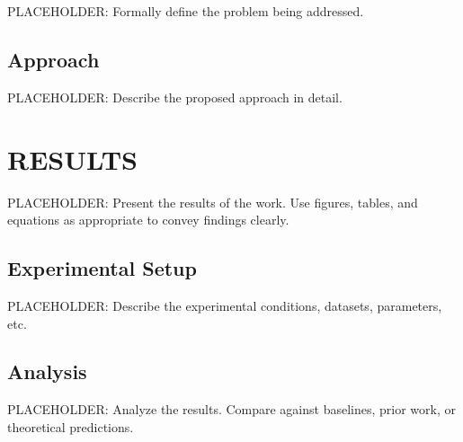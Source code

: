 \documentclass{nrlreport} %
\begin{document}
PLACEHOLDER: Formally define the problem being addressed.

\section{Approach}
\label{sec:approach}

PLACEHOLDER: Describe the proposed approach in detail.



\chapter{RESULTS}
\label{chap:results}

PLACEHOLDER: Present the results of the work. Use figures, tables, and equations
as appropriate to convey findings clearly.

\section{Experimental Setup}
\label{sec:setup}

PLACEHOLDER: Describe the experimental conditions, datasets, parameters, etc.

\section{Analysis}
\label{sec:analysis}

PLACEHOLDER: Analyze the results. Compare against baselines, prior work,
or theoretical predictions.
\end{document}
